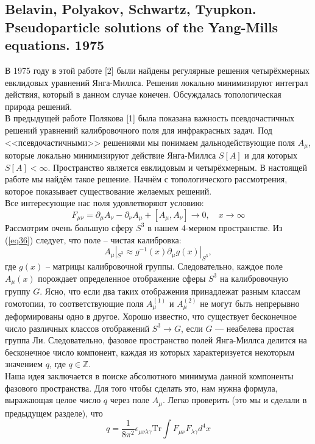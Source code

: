 \documentclass[12pt]{article}
\theoremstyle{definition}
\begin{document}
\subsection{Belavin, Polyakov, Schwartz, Tyupkon. Pseudoparticle solutions of the Yang-Mills equations. 1975}
В 1975 году в этой работе [2] были найдены регулярные решения четырёхмерных евклидовых уравнений Янга-Миллса. Решения локально минимизируют интеграл действия, который в данном случае конечен. Обсуждалась топологическая природа решений.\\
В предыдущей работе Полякова [1] была показана важность псевдочастичных решений уравнений калибровочного поля для инфракрасных задач. Под <<псевдочастичными>> решениями мы понимаем дальнодействующие поля $A_\mu$, которые локально минимизируют действие Янга-Миллса $S[A]$ и для которых $S[A]<\infty$. Пространство является евклидовым и четырёхмерным. В настоящей работе мы найдём такое решение. Начнём с топологического рассмотрения, которое показывает существование желаемых решений.\\
Все интересующие нас поля удовлетворяют условию:
\begin{equation}\label{eq36}
    F_{\mu\nu}=\partial_\mu A_\nu-\partial_\nu A_\mu+[A_\mu,A_\nu]\rightarrow0,\quad x\rightarrow\infty
\end{equation}
Рассмотрим очень большую сферу $S^3$ в нашем 4-мерном пространстве. Из (\ref{eq36}) следует, что поле -- чистая калибровка:
\begin{equation}
    A_\mu|_{S^3}\approx g^{-1}(x)\partial_\mu g(x)|_{S^3},
\end{equation}
где $g(x)$ -- матрицы калибровочной группы. Следовательно, каждое поле $A_\mu(x)$ порождает определенное отображение сферы $S^3$ на калибровочную группу $G$. Ясно, что если два таких отображения принадлежат разным классам гомотопии, то соответствующие поля $A_\mu^{(1)}$ и $A_\mu^{(2)}$ не могут быть непрерывно деформированы одно в другое. Хорошо известно, что существует бесконечное число различных классов отображений $S^3 \rightarrow G$, если $G$ --- неабелева простая группа Ли. Следовательно, фазовое пространство полей Янга-Миллса делится на бесконечное число компонент, каждая из которых характеризуется некоторым значением $q$, где $q\in\mathbb{Z}$.\\
Наша идея заключается в поиске абсолютного минимума данной компоненты фазового пространства. Для того чтобы сделать это, нам нужна формула, выражающая целое число $q$ через поле $A_\mu$. Легко проверить (это мы и сделали в предыдущем разделе), что
\begin{equation}
    q=\frac{1}{8\pi^2}\epsilon_{\mu\nu\lambda\gamma}\text{Tr}\int F_{\mu\nu}F_{\lambda\gamma}d^4x
\end{equation}
\end{document}
